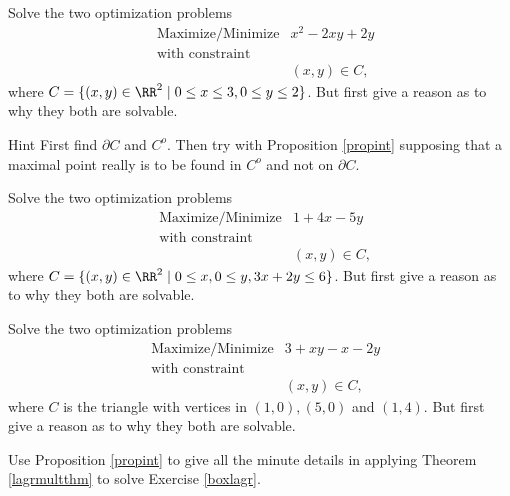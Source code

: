 \documentclass{article}
\begin{document}
\beginshex\label{calcopt1}
Solve the two optimization problems
  \begin{align*}
    &\text{Maximize/Minimize} &x^2 - 2 x y + 2 y\\
    &\text{with constraint}\\
    &&(x, y)\in C,
  \end{align*}
  where $C = \{(x, y)\in \RR^2 \mid 0\leq x \leq 3, 0\leq y \leq 2\}$. But first give a
  reason as to why they both are solvable.
  
  \begin{hideinbutton}{Hint}
    First find $\partial C$ and $C^o$. Then try with Proposition \ref{propint}
    supposing that a maximal point really is to be found in $C^o$ and not
    on $\partial C$.
  \end{hideinbutton}
\endshex


\beginshex\label{calcopt2}
Solve the two optimization problems
  \begin{align*}
    &\text{Maximize/Minimize} &1 + 4 x - 5 y\\
    &\text{with constraint}\\
    &&(x, y)\in C,
  \end{align*}
  where $C = \{(x, y)\in \RR^2 \mid 0\leq x, 0\leq y, 3 x + 2 y \leq 6\}$. But first give a
  reason as to why they both are solvable.
\endshex


\beginshex\label{calcopt3}
Solve the two optimization problems
  \begin{align*}
    &\text{Maximize/Minimize} &3 + x y - x - 2 y\\
    &\text{with constraint}\\
    &&(x, y)\in C,
  \end{align*}
  where $C$ is the triangle with vertices in $(1, 0), (5, 0)$ and $(1, 4)$. But first give a
  reason as to why they both are solvable.
\endshex

\beginshex
Use Proposition \ref{propint} to give all the minute details in applying
Theorem \ref{lagrmultthm} to solve Exercise \ref{boxlagr}.
\endshex
  
  
\end{document}

